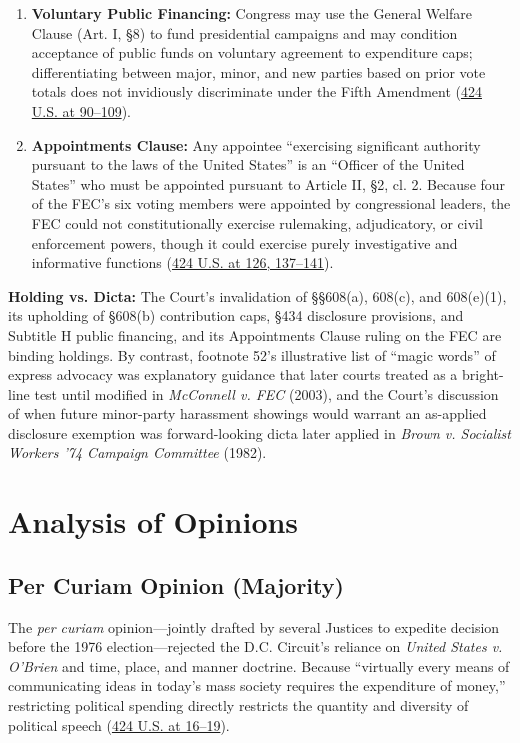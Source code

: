 \documentclass[12pt]{article}
\begin{document}
\begin{enumerate}
  \item \textbf{Voluntary Public Financing:} Congress may use the General Welfare Clause (Art. I, \S 8) to fund presidential campaigns and may condition acceptance of public funds on voluntary agreement to expenditure caps; differentiating between major, minor, and new parties based on prior vote totals does not invidiously discriminate under the Fifth Amendment (\href{https://supreme.justia.com/cases/federal/us/424/1/}{424 U.S. at 90--109}).
  \item \textbf{Appointments Clause:} Any appointee ``exercising significant authority pursuant to the laws of the United States'' is an ``Officer of the United States'' who must be appointed pursuant to Article II, \S 2, cl. 2. Because four of the FEC's six voting members were appointed by congressional leaders, the FEC could not constitutionally exercise rulemaking, adjudicatory, or civil enforcement powers, though it could exercise purely investigative and informative functions (\href{https://supreme.justia.com/cases/federal/us/424/1/}{424 U.S. at 126, 137--141}).
\end{enumerate}

\textbf{Holding vs. Dicta:} The Court's invalidation of \S\S 608(a), 608(c), and 608(e)(1), its upholding of \S 608(b) contribution caps, \S 434 disclosure provisions, and Subtitle H public financing, and its Appointments Clause ruling on the FEC are binding holdings. By contrast, footnote 52's illustrative list of ``magic words'' of express advocacy was explanatory guidance that later courts treated as a bright-line test until modified in \textit{McConnell v. FEC} (2003), and the Court's discussion of when future minor-party harassment showings would warrant an as-applied disclosure exemption was forward-looking dicta later applied in \textit{Brown v. Socialist Workers '74 Campaign Committee} (1982).

\section{Analysis of Opinions}

\subsection{Per Curiam Opinion (Majority)}

The \textit{per curiam} opinion---jointly drafted by several Justices to expedite decision before the 1976 election---rejected the D.C. Circuit's reliance on \textit{United States v. O'Brien} and time, place, and manner doctrine. Because ``virtually every means of communicating ideas in today's mass society requires the expenditure of money,'' restricting political spending directly restricts the quantity and diversity of political speech (\href{https://supreme.justia.com/cases/federal/us/424/1/}{424 U.S. at 16--19}).
\end{document}
